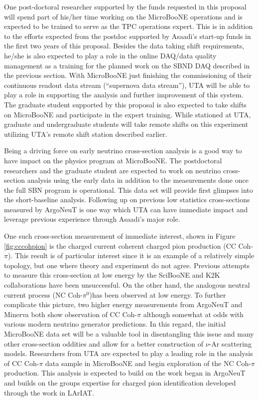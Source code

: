One post-doctoral researcher supported by the funds requested in this proposal will spend part of his/her time working on the MicroBooNE operations and is expected to be trained to serve as the TPC operations expert. This is in addition to the efforts expected from the postdoc supported by Asaadi's start-up funds in the first two years of this proposal.  Besides the data taking shift requirements, he/she is also expected to play a role in the online DAQ/data quality management as a training for the planned work on the SBND DAQ described in the previous section. With MicroBooNE just finishing the commissioning of their continuous readout data stream (``supernova data stream''), UTA will be able to play a role in supporting the analysis and further improvement of this system. The graduate student supported by this proposal is also expected to take shifts on MicroBooNE and participate in the expert training. While stationed at UTA, graduate and undergraduate students will take remote shifts on this experiment utilizing UTA's remote shift station described earlier. 


\label{sec:UbooneDataAnalysis}
Being a driving force on early neutrino cross-section analysis is a good way to have impact on the physics program at MicroBooNE. The postdoctoral researchers and the graduate student are expected to work on neutrino cross-section analysis using the early data in addition to the measurements done once the full SBN program is operational. This data set will provide first glimpses into the short-baseline analysis. Following up on previous low statistics cross-sections measured by ArgoNeuT is one way which UTA can have immediate impact and leverage previous experience through Asaadi's major role. 

One such cross-section measurement of immediate interest, shown in Figure \ref{fig:cccohpion} is the charged current coherent charged pion production (CC Coh-$\pi$). This result is of particular interest since it is an example of a relatively simple topology, but one where theory and experiment do not agree. Previous attempts to measure this cross-section at low energy by the SciBooNE and K2K collaborations have been unsuccessful. On the other hand, the analogous neutral current process (NC Coh-$\pi^{0}$)has been observed at low energy. To further complicate this picture, two higher energy measurements from ArgoNeuT and Minerva both show observation of CC Coh-$\pi$ although somewhat at odds with various modern neutrino generator predictions. In this regard, the initial MicroBooNE data set will be a valuable tool in disentangling this issue and many other cross-section oddities and allow for a better construction of $\nu$-Ar scattering models. Researchers from UTA are expected to play a leading role in the analysis of CC Coh-$\pi$ data sample in MicroBooNE and begin exploration of the NC Coh-$\pi$ production. This analysis is expected to build on the work began in ArgoNeuT \cite{if:ArgoneutPion} and builds on the groups expertise for charged pion identification developed through the work in LArIAT.
 

